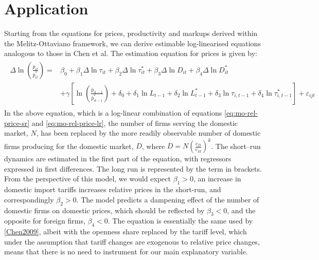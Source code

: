 \section{Application}\label{sec:app}
Starting from the equations for prices, productivity and markups derived within the Melitz-Ottaviano framework, we can derive estimable log-linearised equations analogous to those in Chen et al. The estimation equation for prices is given by:
\begin{align}
\begin{split}\label{eq:gw-estimation-prices}
\Delta \ln \left( \frac{\bar{p}_{it}}{\bar{p}_{it}^*} \right) = &\beta_0 + \beta_1 \Delta \ln \tau_{it} + \beta_2 \Delta \ln \tau_{it}^* + \beta_3 \Delta \ln D_{it} + \beta_4 \Delta \ln D_{it}^* \\ &+ \gamma \left[ \ln \left( \frac{\bar{p}_{it-1}}{\bar{p}_{it-1}^*} \right) + \delta_0 + \delta_1 \ln L_{t-1} + \delta_2\ln L_{t-1}^* + \delta_3 \ln  \tau_{i,t-1} + \delta_4 \ln  \tau_{i,t-1}^* \right] + \varepsilon_{ijt} 
\end{split}\end{align}
In the above equation, which is a log-linear combination of equations \ref{eq:mo-rel-price-sr} and \ref{eq:mo-rel-price-lr}, the number of firms serving the domestic market, $N$, has been replaced by the more readily observable number of domestic firms producing for the domestic market, $D$, where $D=N \left( \frac{c_D}{c_M} \right)^k$. The short--run dynamics are estimated in the first part of the equation, with regressors expressed in first differences. The long run is represented by the term in brackets. From the perspective of this model, we would expect $\beta_1>0$, an increase in domestic import tariffs increases relative prices in the short-run, and correspondingly $\beta_2>0$. The model predicts a dampening effect of the number of domestic firms on domestic prices, which should be reflected by $\beta_3<0$, and the opposite for foreign firms, $\beta_4<0$. The equation is essentially the same used by \ref{Chen2009}, albeit with the openness share replaced by the tariff level, which under the assumption that tariff changes are exogenous to relative price changes, means that there is no need to instrument for our main explanatory variable.


